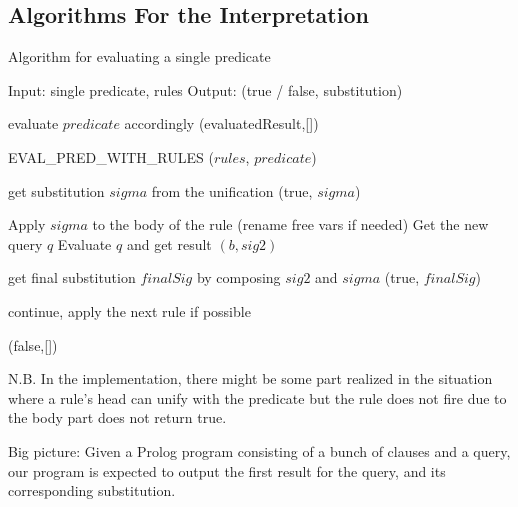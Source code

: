 \documentclass[11pt,a4paper]{report}
\begin{document}
\subsection*{Algorithms For the Interpretation}

\begin{algorithm}
	\caption{Algorithm for evaluating a single predicate}
	
	\begin{algorithmic}
		\State Input: single predicate, rules
		\State Output: (true / false, substitution)
		
				\State evaluate $predicate$ accordingly
				\State \Return (evaluatedResult,[])
			
			\Else
				\State \Return EVAL\_PRED\_WITH\_RULES ($rules$, $predicate$)
			\EndIf
			
		\EndFunction
		
					\State get substitution $sigma$ from the unification
						\State \Return (true, $sigma$)	
						
					\Else
						\State Apply $sigma$ to the body of the rule (rename free vars if needed)
						\State Get the new query $q$
						\State Evaluate $q$ and get result $(b,sig2)$
						
							\State get final substitution $finalSig$ by composing $sig2$ and $sigma$
							\State \Return (true, $finalSig$)
							
						\Else
							\State continue, apply the next rule if possible
						\EndIf				
					\EndIf
				\EndIf
			\EndFor
			
			\State \Return (false,[])
		
		\EndFunction
		
	\end{algorithmic}
	
\end{algorithm}


N.B. In the implementation, there might be some part realized in the situation where a rule's head can unify with the predicate but the rule does not fire due to the body part does not return true.

\bigskip
Big picture:
Given a Prolog program consisting of a bunch of clauses and a query, our program is expected to
output the first result for the query, and its corresponding substitution. \\
\end{document}
